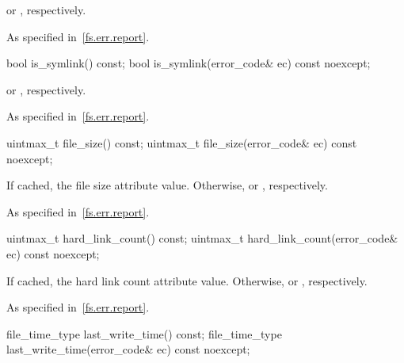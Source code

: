 \begin{itemdescr}
\pnum
\returns {} or , respectively.

\pnum
\throws As specified in~\ref{fs.err.report}.
\end{itemdescr}

%
\begin{itemdecl}
bool is_symlink() const;
bool is_symlink(error_code& ec) const noexcept;
\end{itemdecl}

\begin{itemdescr}
\pnum
\returns {} or , respectively.

\pnum
\throws As specified in~\ref{fs.err.report}.
\end{itemdescr}

%
\begin{itemdecl}
uintmax_t file_size() const;
uintmax_t file_size(error_code& ec) const noexcept;
\end{itemdecl}

\begin{itemdescr}
\pnum
\returns If cached, the file size attribute value.
Otherwise,  or , respectively.

\pnum
\throws As specified in~\ref{fs.err.report}.
\end{itemdescr}

%
\begin{itemdecl}
uintmax_t hard_link_count() const;
uintmax_t hard_link_count(error_code& ec) const noexcept;
\end{itemdecl}

\begin{itemdescr}
\pnum
\returns If cached, the hard link count attribute value.
Otherwise,  or , respectively.

\pnum
\throws As specified in~\ref{fs.err.report}.
\end{itemdescr}

%
\begin{itemdecl}
file_time_type last_write_time() const;
file_time_type last_write_time(error_code& ec) const noexcept;
\end{itemdecl}

